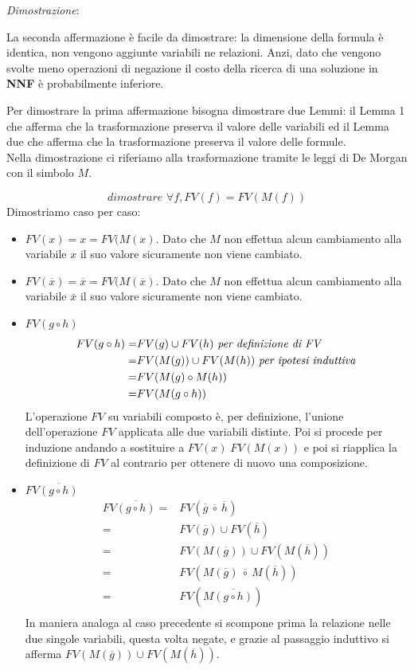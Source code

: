 \documentclass[a4paper]{article}
\newenvironment{dimostrazione}{\textit{Dimostrazione}:\begin{adjustwidth}{1cm}{}}{\end{adjustwidth}}
\begin{document}
\begin{dimostrazione}
	La seconda affermazione è facile da dimostrare: la dimensione della formula è identica, non vengono aggiunte variabili ne relazioni.
	Anzi, dato che vengono svolte meno operazioni di negazione il costo della ricerca di una soluzione in \textbf{NNF} è probabilmente inferiore.

	Per dimostrare la prima affermazione bisogna dimostrare due Lemmi:
	il Lemma 1 che afferma che la trasformazione preserva il valore delle variabili ed il Lemma due che afferma che la trasformazione preserva il valore delle formule.\\
	Nella dimostrazione ci riferiamo alla trasformazione tramite le leggi di De Morgan con il simbolo $M$.

	$$\textit{dimostrare } \forall f, FV(f) = FV(M(f)) $$
	Dimostriamo caso per caso:
	\begin{itemize}
	\item $FV(x) = x = FV(M(x)$. Dato che $M$ non effettua alcun cambiamento alla variabile $x$ il suo valore sicuramente non viene cambiato.
	\item $FV(\overline x) = \overline x = FV(M(\overline x)$. Dato che $M$ non effettua alcun cambiamento alla variabile $\overline x$ il suo valore sicuramente non viene cambiato.
	\item $FV(g \circ h)$ 
		\begin{align*}
		FV(g \circ h) =& FV(g) \cup FV(h) \text{  \textit{per definizione di FV}}\\
			=& FV(M(g)) \cup FV(M(h)) \text{  \textit{per ipotesi induttiva}}\\
			=& FV(M(g) \circ M(h))\\
			=& FV(M(g \circ h))\\
		\end{align*}
		L'operazione $FV$ su variabili composto è, per definizione, l'unione dell'operazione $FV$ applicata alle due variabili distinte.
		Poi si procede per induzione andando a sostituire a $FV(x) \; FV(M(x))$ e poi si riapplica la definizione di $FV$ al contrario per ottenere di nuovo una composizione. 
	\item $FV\overline{(g \circ h)}$
                \begin{align*}
			FV\overline{(g \circ h)} =& FV(\overline g \: \overline \circ \: \overline h)\\
			=& FV(\overline g) \cup FV(\overline h)\\
                        =& FV(M(\overline g)) \cup FV(M(\overline h))\\
                        =& FV(M(\overline g) \: \overline \circ \: M( \overline h))\\
			=& FV(M \overline{(g \circ h)})\\
                \end{align*}
		In maniera analoga al caso precedente si scompone prima la relazione nelle due singole variabili, questa volta negate, e grazie al passaggio induttivo si afferma $FV(M(\overline g)) \cup FV(M(\overline h))$.
	\end{itemize}



\end{dimostrazione}
\end{document}
